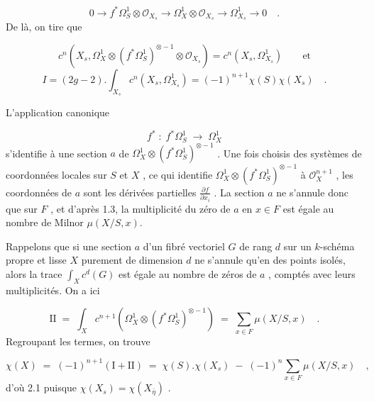 \begin{equation*}
0 \to f^{*}\Omega^{1}_{S} \otimes \mathcal{O}_{X_{s}} \to \Omega^{1}_{X} \otimes \mathcal{O}_{X_{s}} \to \Omega^{1}_{X_{s}} \to 0 \quad .
\end{equation*}
De là, on tire que

\begin{equation*}
c^{n}(X_{s},\Omega^{1}_{X} \otimes (f^{*} \Omega^{1}_{S})^{\otimes -1} \otimes \mathcal{O}_{X_{s}}) = c^{n}(X_{s},\Omega^{1}_{X_{s}}) \qquad \mathrm{et}
\end{equation*}
\begin{equation*}
I = (2g-2) . \int_{X_{s}} c^{n}(X_{s},\Omega^{1}_{X_{s}}) = (-1)^{n+1} \chi(S) \chi(X_{s}) \quad .
\end{equation*}


L'application canonique

\begin{equation*}
f^* \; : \; f^*\Omega^1_S \; \longrightarrow \; \Omega^1_X
\end{equation*}
s'identifie à une section $a$ de $\Omega^1_X \otimes (f^*\Omega^1_S)^{\otimes -1}$ . Une fois choisis des systèmes de coordonnées locales sur $S$ et $X$ , ce qui identifie $\Omega^1_X \otimes (f^*\Omega^1_S)^{\otimes -1}$ à $\mathcal{O}_X^{n+1}$ , les coordonnées de $a$ sont les dérivées partielles $\frac{\partial f}{\partial x_i}$ . La section $a$ ne s'annule donc que sur $F$ , et d'après 1.3, la multiplicité du zéro de $a$ en $x \in F$ est égale au nombre de Milnor $\mu(X/S,x)$.

Rappelons que si une section $a$ d'un fibré vectoriel $G$ de rang $d$ sur un $k$-schéma propre et lisse $X$ purement de dimension $d$ ne s'annule qu'en des points isolés, alors la trace $\int_X c^d(G)$ est égale au nombre de zéros de $a$ , comptés avec leurs multiplicités. On a ici

\begin{equation*}
\mathrm{II} \; = \; \int_X c^{n+1}(\Omega^1_X \otimes (f^*\Omega^1_S)^{\otimes -1}) \; = \; \sum_{x \in F} \mu(X/S,x) \quad .
\end{equation*}
Regroupant les termes, on trouve

\begin{equation*}
\chi(X) \; = \; (-1)^{n+1}(\mathrm{I} + \mathrm{II}) \; = \; \chi(S).\chi(X_s) \; - \; (-1)^n \sum_{x \in F} \mu(X/S,x) \quad ,
\end{equation*}
d'où 2.1 puisque $\chi(X_s) = \chi(X_{\bar{\eta}})$ .

